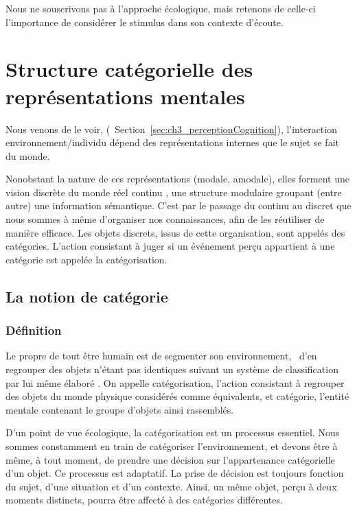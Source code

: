 Nous ne souscrivons pas à l'approche écologique, mais retenons de celle-ci l'importance de considérer le stimulus dans son contexte d'écoute.

\section{Structure catégorielle des représentations mentales}
\label{sec:ch3_representationMentale}
 
Nous venons de le voir, (\cf~Section~\ref{sec:ch3_perceptionCognition}), l'interaction environnement/individu dépend des représentations internes que le sujet se fait du monde.
 
Nonobstant la nature de ces représentations (modale, amodale), elles forment une vision discrète du monde réel continu \citep{houde1998vocabulaire}, une structure modulaire groupant (entre autre) une information sémantique. C'est par le passage du continu au discret que nous sommes à même d'organiser nos connaissances, afin de les réutiliser de manière efficace. Les objets discrets, issus de cette organisation, sont appelés des catégories. L'action consistant à juger si un événement perçu appartient à une catégorie est appelée la catégorisation.
 
\subsection{La notion de catégorie}

\subsubsection{Définition}
\label{sec:ch3_categorieDef}

Le propre de tout être humain est de segmenter son environnement, \ie~d'en regrouper des objets n'étant pas identiques suivant un système de classification par lui même élaboré \citep[p. 1]{rosch1978cognition}. On appelle catégorisation, l'action consistant à regrouper des objets du monde physique considérés comme équivalents, et catégorie, l'entité mentale contenant le groupe d'objets ainsi rassemblés.
 
D'un point de vue écologique, la catégorisation est un processus essentiel. Nous sommes constamment en train de catégoriser l'environnement, et devons être à même, à tout moment, de prendre une décision sur l'appartenance catégorielle d'un objet. Ce processus est adaptatif. La prise de décision est toujours fonction du sujet, d'une situation et d'un contexte. Ainsi, un même objet, perçu à deux moments distincts, pourra être affecté à des catégories différentes. 

